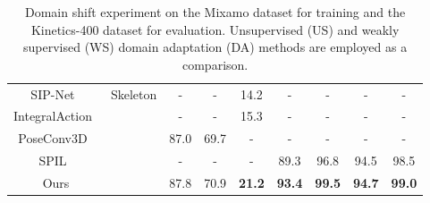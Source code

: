 \documentclass[10pt,twocolumn,letterpaper]{article}
\begin{document}
\begin{table*}[tb]
\begin{minipage}[l]{0.55\textwidth}
{\begin{tabular}{c|c|cc|ccccc}
        SIP-Net~\cite{Weinzaepfel2021IJCV}              &  \multirow{5}{*}{Skeleton}   & -             & -                & 14.2           & -  & - & - & - \\ 
        IntegralAction~\cite{Moon2021CVPR}              &                             & -             & -                & 15.3          & - & - & - & - \\ 
        PoseConv3D~\cite{Duan2022CVPR}                  &                             & 87.0          & 69.7             & -            & -    & - & - & - \\ 
        SPIL~\cite{Su2020ECCV}                          &                             & -             & -                & -      & 89.3 & 96.8 & 94.5 & 98.5  \\ 
        Ours                                            &                             & 87.8          & 70.9             & \textbf{21.2}&  \textbf{93.4} & \textbf{99.5} & \textbf{94.7} & \textbf{99.0} \\ \hline 
        \end{tabular}
        \label{tab:other_datasets}
    }
  \end{minipage}
  \begin{minipage}[c]{0.4\textwidth}
    \caption{Domain shift experiment on the Mixamo dataset for training and the Kinetics-400 dataset for evaluation. Unsupervised (US) and weakly supervised (WS) domain adaptation (DA) methods are employed as a comparison.}
    \vspace{-1em}
    \hspace{1em}
\end{minipage}
\end{table*}
\end{document}
